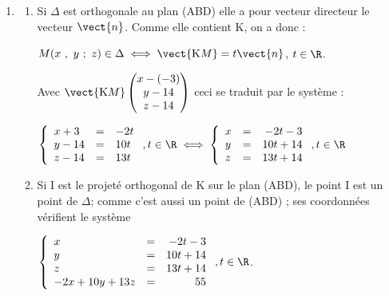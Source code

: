 \begin{enumerate}
\begin{enumerate}
$\vect{n} \cdot \vect{\text{AB}} = - 10 + 10 + 0 = 0$ et $\vect{n} \cdot \vect{\text{AD}} = 2 + 50 - 52 = 0$.

Conclusion : le vecteur $\vect{n}$, orthogonal à deux vecteurs non colinéaires du plan (ABD), est normal à ce plan.
		\item 
Le résultat précédent montre que le plan (ABD) a une équation de la forme\\
$-2x + 10y + 13z = d$, avec $d \in \R$.

Or par exemple $\text{B}(2~;~2~;~3) \in (\text{ABD})$ donc \\
$-2 \times 2  + 10 \times 2  + 13\times 3 = d \iff - 4 + 20 + 39 = d \iff d = 55$.

Donc le plan (ABD) a pour équation $ -2x + 10y + 13z = 55$.
	\end{enumerate}
	
\item
	\begin{enumerate}
		\item 
Si $\Delta$ est orthogonale au plan (ABD) elle a pour vecteur directeur le vecteur $\vect{n}$. Comme elle contient K, on a donc :

$M(x~,~y~;~z) \in \Delta \iff \vect{\text{K}M} = t\vect{n}$, \: $t \in \R$. 

Avec $\vect{\text{K}M}\begin{pmatrix}x - (-3)\\y - 14\\z - 14\end{pmatrix}$ ceci se traduit par le système :

$\left\{\begin{array}{l c l}
x + 3&=&- 2t\\
y - 14&=&10t\\
z - 14&=&13t
\end{array}\right., t \in \R \iff \left\{\begin{array}{l c r}
x &=&- 2t - 3\\
y &=&10t + 14\\
z &=&13t + 14
\end{array}\right., t \in \R $
		\item 
Si I est le projeté orthogonal de K sur le plan (ABD), le point I est un point de $\Delta$; comme c'est aussi un point de (ABD) ; ses coordonnées vérifient  le système

$\left\{\begin{array}{l c r}
x &=&- 2t - 3\\
y &=&10t + 14\\
z &=&13t + 14\\
- 2x + 10y + 13z &=& 55
\end{array}\right., t \in \R $.


\end{enumerate}
\end{enumerate}
